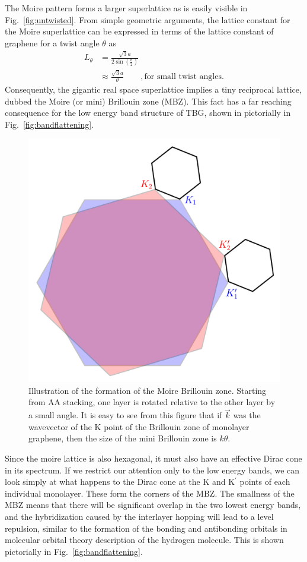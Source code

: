 The Moire pattern forms a larger superlattice as is easily visible in Fig.~\ref{fig:untwisted}. From simple geometric arguments, the lattice constant for the Moire superlattice can be expressed in terms of the lattice constant of graphene for a twist angle $\theta$ as~\cite{Bistritzer2011}
\begin{align}
    L_\theta &= \frac{\sqrt{3}a}{2\sin\left(\frac{\theta}{2}\right)}\, \nonumber  \\
    &\approx \frac{\sqrt{3}a}{\theta} \quad\quad, \text{for small twist angles.}
\end{align}
Consequently, the gigantic real space superlattice implies a tiny reciprocal lattice, dubbed the Moire (or mini) Brillouin zone (MBZ).  
This fact has a far reaching consequence for the low energy band structure of TBG, shown in pictorially in Fig.~\ref{fig:bandflattening}. 
\begin{figure}[!ht]
    \centering
    \includegraphics[width=0.5\linewidth]{figures/introduction/TBGmoire.pdf}  
    \caption{Illustration of the formation of the Moire Brillouin zone. Starting from AA stacking, one layer is rotated relative to the other layer by a small angle. It is easy to see from this figure that if $\vec{k}$ was the wavevector of the K point of the Brillouin zone of monolayer graphene, then the size of the mini Brillouin zone is $k\theta$.}
    \label{fig:moirebrilluoinzone}
\end{figure}
\par
Since the moire lattice is also hexagonal, it must also have an effective Dirac cone in its spectrum. 
If we restrict our attention only to the low energy bands, we can look simply at what happens to the Dirac cone at the K and K${}^\prime$ points of each individual monolayer. These form the corners of the MBZ. The smallness of the MBZ means that there will be significant overlap in the two lowest energy bands, and the hybridization caused by the interlayer hopping will lead to a level repulsion, similar to the formation of the bonding and antibonding orbitals in molecular orbital theory description of the hydrogen molecule. This is shown pictorially in Fig.~\ref{fig:bandflattening}.

